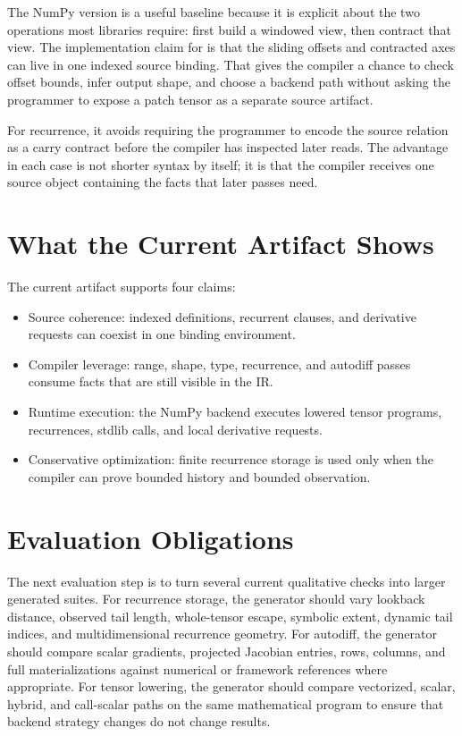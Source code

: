 The NumPy version is a useful baseline because it is explicit about the two
operations most libraries require: first build a windowed view, then contract
that view. The implementation claim for \einlang{} is that the sliding offsets
and contracted axes can live in one indexed source binding. That gives the
compiler a chance to check offset bounds, infer output shape, and choose a
backend path without asking the programmer to expose a patch tensor as a
separate source artifact.

For recurrence, it avoids requiring the programmer to encode the source
relation as a carry contract before the compiler has inspected later reads. The
advantage in each case is not shorter syntax by itself; it is that the compiler
receives one source object containing the facts that later passes need.

\section{What the Current Artifact Shows}

The current artifact supports four claims:

\begin{itemize}
\item Source coherence: indexed definitions, recurrent clauses, and derivative
requests can coexist in one binding environment.
\item Compiler leverage: range, shape, type, recurrence, and autodiff passes
consume facts that are still visible in the IR.
\item Runtime execution: the NumPy backend executes lowered tensor programs,
recurrences, stdlib calls, and local derivative requests.
\item Conservative optimization: finite recurrence storage is used only when
the compiler can prove bounded history and bounded observation.
\end{itemize}

\section{Evaluation Obligations}

The next evaluation step is to turn several current qualitative checks into
larger generated suites. For recurrence storage, the generator should vary
lookback distance, observed tail length, whole-tensor escape, symbolic extent,
dynamic tail indices, and multidimensional recurrence geometry. For autodiff,
the generator should compare scalar gradients, projected Jacobian entries,
rows, columns, and full materializations against numerical or framework
references where appropriate. For tensor lowering, the generator should compare
vectorized, scalar, hybrid, and call-scalar paths on the same mathematical
program to ensure that backend strategy changes do not change results.

